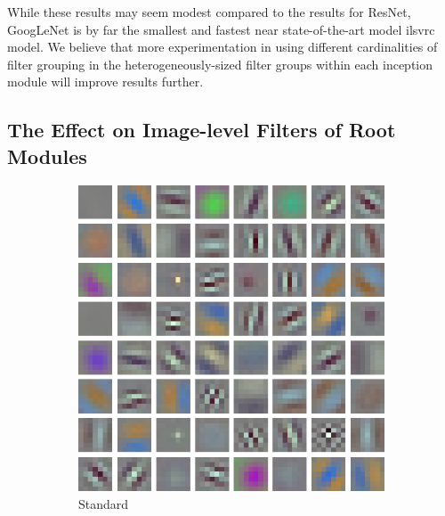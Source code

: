 \documentclass[thesis]{subfiles}
\begin{document}
	While these results may seem modest compared to the results for ResNet, GoogLeNet is by far the smallest and fastest near state-of-the-art model \gls{ilsvrc} model. We believe that more experimentation in using different cardinalities of filter grouping in the heterogeneously-sized filter groups within each \gls{inception} module will improve results further.
	
	\subsection{The Effect on Image-level Filters of Root Modules}
	\begin{figure}[tb]
		\centering
		\begin{subfigure}[b]{0.45\textwidth}
			\centering
			\includegraphics[width=\textwidth]{Figs/Raster/msrc-resnet-50-conv1}
			\caption{Standard}
			\label{fig:resnet50normalconv0}
		\end{subfigure}
		~
		\begin{subfigure}[b]{0.45\textwidth}
			\centering

\end{subfigure}
\end{figure}
\end{document}
